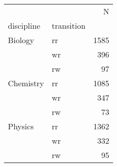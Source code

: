 \begin{tabular}{llr}
\toprule
        &    &     N \\
discipline & transition &       \\
\midrule
Biology & rr &  1585 \\
        & wr &   396 \\
        & rw &    97 \\
Chemistry & rr &  1085 \\
        & wr &   347 \\
        & rw &    73 \\
Physics & rr &  1362 \\
        & wr &   332 \\
        & rw &    95 \\
\bottomrule
\end{tabular}
